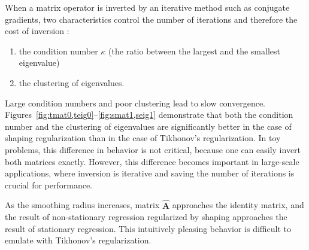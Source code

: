 When a matrix operator is inverted by an iterative method such as
conjugate gradients, two characteristics control the number of
iterations and therefore the cost of inversion \cite[]{golub,vorst}:
\begin{enumerate}
\item the condition number $\kappa$ (the ratio between the largest and the smallest eigenvalue)
\item the clustering of eigenvalues.
\end{enumerate}
Large condition numbers and poor clustering lead to slow convergence.
Figures~\ref{fig:tmat0,teig0}--\ref{fig:smat1,seig1} demonstrate that
both the condition number and the clustering of eigenvalues are
significantly better in the case of shaping regularization than in the
case of Tikhonov's regularization. In toy problems, this difference in
behavior is not critical, because one can easily invert both matrices
exactly. However, this difference becomes important in large-scale
applications, where inversion is iterative and saving the number
of iterations is crucial for performance.

As the smoothing radius increases, matrix $\widehat{\mathbf{A}}$
approaches the identity matrix, and the result of non-stationary
regression regularized by shaping approaches the result of stationary
regression. This intuitively pleasing behavior is difficult to emulate
with Tikhonov's regularization.



